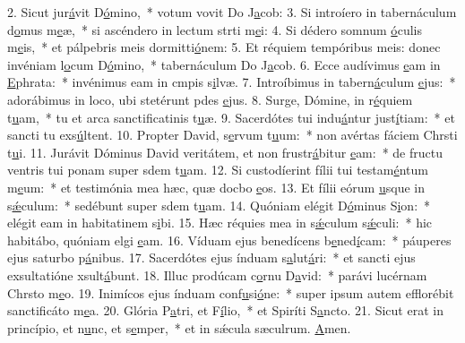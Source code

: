 2. Sicut jur\uline{á}vit D\uline{ó}mino,~* votum vovit Do J\uline{a}cob:
3. Si introíero in tabernáculum d\uline{o}mus m\uline{e}æ,~* si ascéndero in lectum strti m\uline{e}i:
4. Si dédero somnum \uline{ó}culis m\uline{e}is,~* et pálpebris meis dormitti\uline{ó}nem:
5. Et réquiem tempóribus meis: donec invéniam l\uline{o}cum D\uline{ó}mino,~* tabernáculum Do J\uline{a}cob.
6. Ecce audívimus \uline{e}am in \uline{E}phrata:~* invénimus eam in cmpis s\uline{i}lvæ.
7. Introíbimus in tabern\uline{á}culum \uline{e}jus:~* adorábimus in loco, ubi stetérunt pdes \uline{e}jus.
8. Surge, Dómine, in r\uline{é}quiem t\uline{u}am,~* tu et arca sanctificatinis t\uline{u}æ.
9. Sacerdótes tui indu\uline{á}ntur just\uline{í}tiam:~* et sancti tu exs\uline{ú}ltent.
10. Propter David, s\uline{e}rvum t\uline{u}um:~* non avértas fáciem Chrsti t\uline{u}i.
11. Jurávit Dóminus David veritátem, et non frustr\uline{á}bitur \uline{e}am:~* de fructu ventris tui ponam super sdem t\uline{u}am.
12. Si custodíerint fílii tui testam\uline{é}ntum m\uline{e}um:~* et testimónia mea hæc, quæ docbo \uline{e}os.
13. Et fílii eórum \uline{u}sque in s\uline{ǽ}culum:~* sedébunt super sdem t\uline{u}am.
14. Quóniam elégit D\uline{ó}minus S\uline{i}on:~* elégit eam in habitatinem s\uline{i}bi.
15. Hæc réquies mea in s\uline{ǽ}culum s\uline{ǽ}culi:~* hic habitábo, quóniam elgi \uline{e}am.
16. Víduam ejus benedícens b\uline{e}ned\uline{í}cam:~* páuperes ejus saturbo p\uline{á}nibus.
17. Sacerdótes ejus índuam s\uline{a}lut\uline{á}ri:~* et sancti ejus exsultatióne xsult\uline{á}bunt.
18. Illuc prodúcam c\uline{o}rnu D\uline{a}vid:~* parávi lucérnam Chrsto m\uline{e}o.
19. Inimícos ejus índuam conf\uline{u}si\uline{ó}ne:~* super ipsum autem efflorébit sanctificáto m\uline{e}a.
20. Glória P\uline{a}tri, et F\uline{í}lio,~* et Spiríti S\uline{a}ncto.
21. Sicut erat in princípio, et n\uline{u}nc, et s\uline{e}mper,~* et in sǽcula sæculrum. \uline{A}men.
